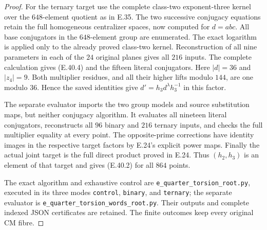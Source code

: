 \begin{proof}
For the ternary target use the complete
class-two exponent-three kernel over the
$648$-element quotient as in E.35.
The two successive conjugacy equations retain
the full homogeneous centralizer spaces,
now computed for $d=abc$.
All base conjugators in the $648$-element
group are enumerated.  The exact logarithm
is applied only to the already proved
class-two kernel.
Reconstruction of all nine parameters in
each of the $24$ original planes gives
all $216$ inputs.  The complete calculation
gives \textup{(E.40.4)} and the fifteen
literal conjugators.
Here $|d|=36$ and $|z_4|=9$.
Both multiplier residues, and all their
higher lifts modulo $144$, are one modulo
$36$.  Hence the saved identities give
$d'=h_3d^\lambda h_3^{-1}$ in this factor.

The separate evaluator imports the two
group models and source substitution maps,
but neither conjugacy algorithm.  It
evaluates all nineteen literal conjugators,
reconstructs all $96$ binary and $216$
ternary inputs, and checks the full
multiplier equality at every point.
The opposite-prime corrections have
identity images in the respective target
factors by E.24's explicit power maps.
Finally the actual joint target is the
full direct product proved in E.24.
Thus $(h_2,h_3)$ is an element of that
target and gives \textup{(E.40.2)} for
all $864$ points.

The exact algorithm and exhaustive control
are \texttt{e\_quarter\_torsion\_root.py},
executed in its three modes
\texttt{control}, \texttt{binary}, and
\texttt{ternary}; the separate evaluator is
\texttt{e\_quarter\_torsion\_words\_root.py}.
Their outputs and complete indexed JSON
certificates are retained.  The finite
outcomes keep every original CM fibre.
\end{proof}
